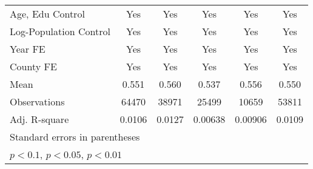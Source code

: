 {{\begin{tabular}{l*{5}{c}}
        Age, Edu Control                        & Yes                             & Yes                             & Yes                        & Yes                       & Yes                           \\
        Log-Population Control                  & Yes                             & Yes                             & Yes                        & Yes                       & Yes                           \\
        Year FE                                 & Yes                             & Yes                             & Yes                        & Yes                       & Yes                           \\
        County FE                               & Yes                             & Yes                             & Yes                        & Yes                       & Yes                           \\
        \midrule
        Mean                                    & 0.551                           & 0.560                           & 0.537                      & 0.556                     & 0.550                         \\
        Observations                            & 64470                           & 38971                           & 25499                      & 10659                     & 53811                         \\
        Adj. R-square                           & 0.0106                          & 0.0127                          & 0.00638                    & 0.00906                   & 0.0109                        \\
        \bottomrule
        \multicolumn{6}{l}{\footnotesize Standard errors in parentheses}                                                                                                                                     \\
        \multicolumn{6}{l}{\footnotesize \sym{*} \(p<0.1\), \sym{**} \(p<0.05\), \sym{***} \(p<0.01\)}                                                                                                       \\
    \end{tabular}
    }    
}